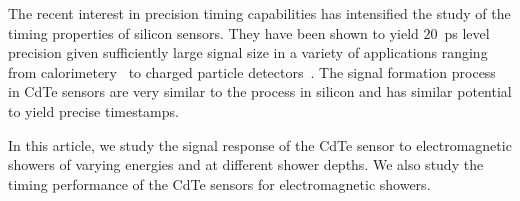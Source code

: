 The recent interest in precision timing capabilities has intensified
the study of the timing properties of silicon sensors. They have been
shown to yield $20$~ps level precision given sufficiently large signal size
in a variety of applications ranging from calorimetery~\cite{SiliconTiming} to 
charged particle detectors~\cite{santacruz}. The signal formation process
in CdTe sensors are very similar to the process in silicon and has 
similar potential to yield precise timestamps.

In this article, we study the signal response of the CdTe sensor to electromagnetic
showers of varying energies and at different shower depths. We also study the timing
performance of the CdTe sensors for electromagnetic showers.

